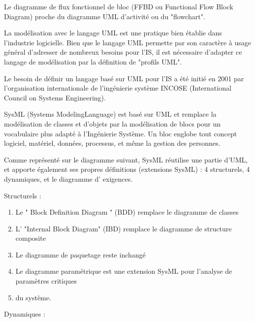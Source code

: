 \documentclass[12pt,a4paper]{report}
\begin{document}
	\noindent Le diagramme de flux fonctionnel de bloc (FFBD ou Functional Flow Block Diagram) proche du diagramme UML d'activit\'{e} ou du "flowchart". 
	
	\noindent  La mod\'{e}lisation avec le langage UML est une pratique bien \'{e}tablie dans l'industrie logicielle. Bien que le langage UML permette par son caract\`{e}re \`{a} usage g\'{e}n\'{e}ral d'adresser de nombreux besoins pour l'IS, il est n\'{e}cessaire d'adapter ce langage de mod\'{e}lisation par la d\'{e}finition de  "profils UML".
	
	\noindent Le besoin de d\'{e}finir un langage bas\'{e} sur UML pour l'IS a \'{e}t\'{e} initi\'{e} en 2001 par l'organisation internationale de l'ing\'{e}nierie syst\`{e}me INCOSE (International Council on Systems Engineering).
	
	\noindent SysML (Systems ModelingLanguage) est bas\'{e} sur UML et remplace la mod\'{e}lisation de classes et d'objets par la mod\'{e}lisation de blocs pour un vocabulaire plus adapt\'{e} \`{a} l'Ing\'{e}nierie Syst\`{e}me. Un bloc englobe tout concept logiciel, mat\'{e}riel, donn\'{e}es, processus, et m\^{e}me la gestion des personnes.
	
	\noindent Comme repr\'{e}sent\'{e} sur le diagramme suivant, SysML r\'{e}utilise une partie d'UML, et apporte \'{e}galement ses propres d\'{e}finitions (extensions SysML) : 4 structurels, 4 dynamiques, et le diagramme d' exigences.
	
	\noindent Structurels :


\begin{enumerate}
	\item  Le " Block Definition Diagram " (BDD) remplace le diagramme de classes
	
	\item  L' "Internal Block Diagram" (IBD) remplace le diagramme de structure composite
	
	\item  Le diagramme de paquetage reste inchang\'{e}
	
	\item  Le diagramme param\'{e}trique est une extension SysML pour l'analyse de param\`{e}tres critiques
	
	\item  du syst\`{e}me.
\end{enumerate}

\noindent \begin{flushleft}
	Dynamiques :
\end{flushleft}
\end{document}
